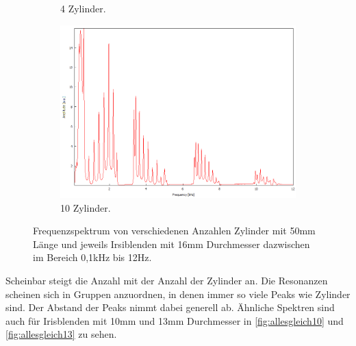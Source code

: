 \begin{figure}
\begin{subfigure}[b]{0.3\textwidth}
        \caption{4 Zylinder.}
    \end{subfigure}
    \hfill
    \begin{subfigure}[b]{0.3\textwidth}
        \centering
        \includegraphics[width=\textwidth]{data/4_1/10.png}
        \caption{10 Zylinder.}
    \end{subfigure}
    \hfill
    \caption{Frequenzspektrum von verschiedenen Anzahlen Zylinder mit 50\;mm Länge und jeweils Irsiblenden mit 16\;mm Durchmesser dazwischen im Bereich 0,1\;kHz bis 12\;Hz.}
    \label{fig:allesgleich}
\end{figure}
Scheinbar steigt die Anzahl mit der Anzahl der Zylinder an. Die Resonanzen scheinen sich in
Gruppen anzuordnen, in denen immer so viele Peaks wie Zylinder sind. Der Abstand der Peaks nimmt
dabei generell ab. Ähnliche Spektren sind auch für Irisblenden mit 10\;mm und 13\;mm Durchmesser 
in \autoref{fig:allesgleich10} und \autoref{fig:allesgleich13} zu sehen.
